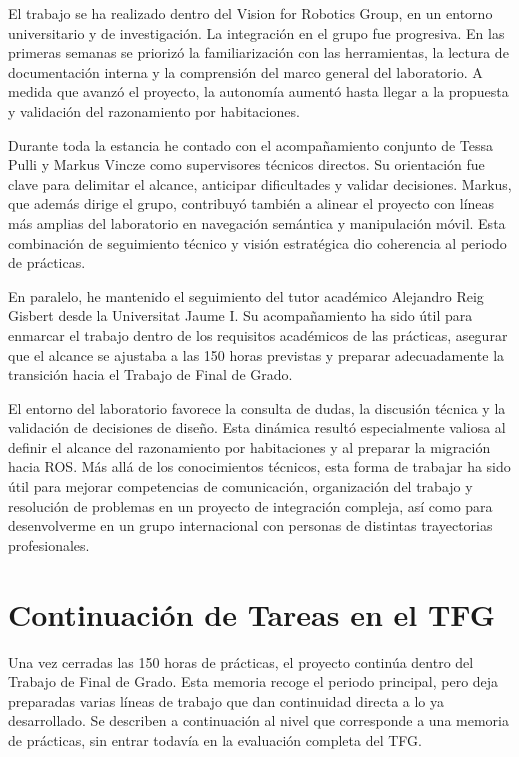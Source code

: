 \documentclass[11pt,fleqn,openany]{book} %
\begin{document}
El trabajo se ha realizado dentro del Vision for Robotics Group, en un entorno universitario y de investigación. La integración en el grupo fue progresiva. En las primeras semanas se priorizó la familiarización con las herramientas, la lectura de documentación interna y la comprensión del marco general del laboratorio. A medida que avanzó el proyecto, la autonomía aumentó hasta llegar a la propuesta y validación del razonamiento por habitaciones.

Durante toda la estancia he contado con el acompañamiento conjunto de Tessa Pulli y Markus Vincze como supervisores técnicos directos. Su orientación fue clave para delimitar el alcance, anticipar dificultades y validar decisiones. Markus, que además dirige el grupo, contribuyó también a alinear el proyecto con líneas más amplias del laboratorio en navegación semántica y manipulación móvil. Esta combinación de seguimiento técnico y visión estratégica dio coherencia al periodo de prácticas.

En paralelo, he mantenido el seguimiento del tutor académico Alejandro Reig Gisbert desde la Universitat Jaume I. Su acompañamiento ha sido útil para enmarcar el trabajo dentro de los requisitos académicos de las prácticas, asegurar que el alcance se ajustaba a las 150 horas previstas y preparar adecuadamente la transición hacia el Trabajo de Final de Grado.

El entorno del laboratorio favorece la consulta de dudas, la discusión técnica y la validación de decisiones de diseño. Esta dinámica resultó especialmente valiosa al definir el alcance del razonamiento por habitaciones y al preparar la migración hacia ROS. Más allá de los conocimientos técnicos, esta forma de trabajar ha sido útil para mejorar competencias de comunicación, organización del trabajo y resolución de problemas en un proyecto de integración compleja, así como para desenvolverme en un grupo internacional con personas de distintas trayectorias profesionales.



\chapter{Continuación de Tareas en el TFG}\label{chap:tfg}

Una vez cerradas las 150 horas de prácticas, el proyecto continúa dentro del Trabajo de Final de Grado. Esta memoria recoge el periodo principal, pero deja preparadas varias líneas de trabajo que dan continuidad directa a lo ya desarrollado. Se describen a continuación al nivel que corresponde a una memoria de prácticas, sin entrar todavía en la evaluación completa del TFG.
\end{document}
